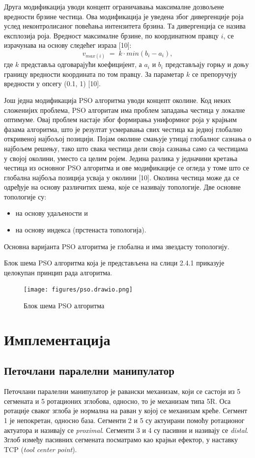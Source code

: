 \documentclass[12pt]{article}
\begin{document}
Друга модификација уводи концепт ограничавања максималне дозвољене вредности брзине честица. Ова модификација је уведена због дивергенције роја услед неконтролисаног повећања интензитета брзина. Та дивергенција се назива експлозија роја. Вредност максималне брзине, по координатном правцу $i$, се израчунава на основу следећег израза [10]:
\begin{equation}
    v_{max(i)}\;=\;k\cdot min(b_i - a_i),
\end{equation}
где $k$ представља одговарајући коефицијент, а $a_i$ и $b_i$ представљају горњу и доњу границу вредности координата по том правцу. За параметар $k$ се препоручују вредности у опсегу (0.1, 1) [10].

Још једна модификација PSO алгоритма уводи концепт околине. Код неких сложенијих проблема, PSO алгоритам има проблем западања честица у локалне оптимуме. Овај проблем настаје због формирања униформног роја у крајњим фазама алгоритма, што је резултат усмеравања свих честица ка једној глобално откривеној најбољој позицији. Појам околине смањује утицај глобалног сазнања о најбољем решењу, тако што свака честица дели своја сазнања само са честицама у својој околини, уместо са целим ројем. Једина разлика у једначини кретања честица из основног PSO алгоритма и ове модификације се огледа у томе што се глобална најбоља позиција усваја у околини [10]. Околина честица може да се одређује на основу различитих шема, које се називају топологије. Две основне топологије су:
\begin{itemize}
    \item на основу удаљености и
    \item на основу индекса (прстенаста топологија).
\end{itemize}
Основна варијанта PSO алгоритма је глобална и има звездасту топологију.


Блок шема PSO алгоритма која је представљена на слици 2.4.1 приказује целокупан принцип рада алгоритма.

\begin{figure}[H]
    \centering
    \texttt{[image: figures/pso.drawio.png]}
    \caption{Блок шема PSO алгоритма}
    \label{fig:PSO_алгоритам}
\end{figure}
\newpage

\section{Имплементација}

\subsection{Петочлани паралелни манипулатор}
Петочлани паралелни манипулатор је равански механизам, који се састоји из 5 сегмената и 5 ротационих зглобова, односно, то је механизам типа 5R. Оса ротације сваког зглоба је нормална на раван у којој се механизам креће. Сегмент 1 је непокретан, односно база. Сегменти 2 и 5 су актуирани помоћу ротационог актуатора и називају се \textit{proximal}. Сегменти 3 и 4 су пасивни и називају се \textit{distal}. Зглоб између пасивних сегмената посматрамо као крајњи ефектор, у наставку TCP (\textit{tool center point}).
\end{document}
